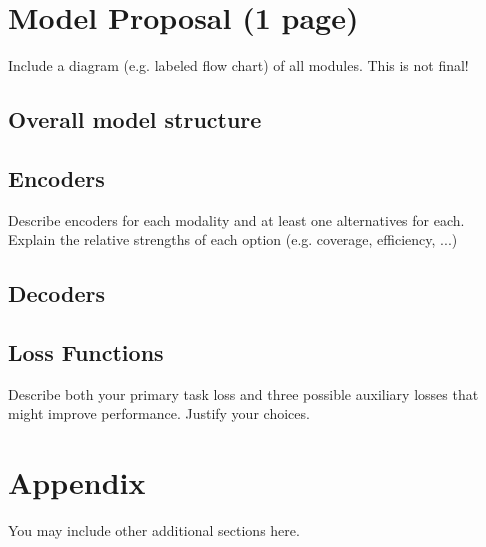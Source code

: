 \documentclass{article} %
\begin{document}
\clearpage
\section{Model Proposal (1 page)}
Include a diagram (e.g. labeled flow chart) of all modules.  This is not final!

\subsection{ Overall model structure }

\subsection{ Encoders }
Describe encoders for each modality and at least one alternatives for each.  Explain the relative strengths of each option (e.g. coverage, efficiency, ...)

\subsection{ Decoders }

\subsection{ Loss Functions }
Describe both your primary task loss and three possible auxiliary losses that might improve performance.  Justify your choices.





\appendix
\section{Appendix}
You may include other additional sections here.
\end{document}
